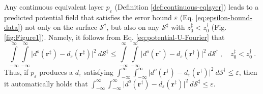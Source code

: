 \begin{remark}
	\label{rm:remark3}
	Any continuous equivalent layer $p_{\varepsilon}$ (Definition \ref{def:continuous-eqlayer}) leads to a predicted 
	potential field that satisfies
	the error bound $\varepsilon$ (Eq. \ref{eq:epsilon-bound-data}) not only on the surface $\mathcal{S}^{\dagger}$, but also 
	on any $\mathcal{S}^{\ddagger}$ with $z^{\ddagger}_{0} < z^{\dagger}_{0}$ (Fig. \ref{fig:Figure1}). 
	Namely, it follows from Eq. \ref{eq:potential-U-Fourier} that
	\begin{equation}
		\int\limits_{-\infty}^{\infty} \int\limits_{-\infty}^{\infty}
		\vert d^{o}(\mathbf{r}^{\ddagger}) - d_{\varepsilon}(\mathbf{r}^{\ddagger})
		\vert^{2} \: d\mathcal{S}^{\ddagger} \le
		\int\limits_{-\infty}^{\infty} \int\limits_{-\infty}^{\infty}
		\vert d^{o}(\mathbf{r}^{\dagger}) - d_{\varepsilon}(\mathbf{r}^{\dagger})
		\vert^{2} \: d\mathcal{S}^{\dagger} \: ,
		\quad z^{\ddagger}_{0} < z^{\dagger}_{0} \: .
		\label{eq:error-bound-upper-planes}
	\end{equation}
	Thus, if $p_{\varepsilon}$ produces a $d_{\varepsilon}$ satisfying 
	$\int_{-\infty}^{\infty} \int_{-\infty}^{\infty} \vert d^{o}(\mathbf{r}^{\dagger}) - d_{\varepsilon}(\mathbf{r}^{\dagger}) 
	\vert^{2} \: d\mathcal{S}^{\dagger} \le \varepsilon$, then it automatically holds that 
	$\int_{-\infty}^{\infty} \int_{-\infty}^{\infty} \vert d^{o}(\mathbf{r}^{\ddagger}) - d_{\varepsilon}(\mathbf{r}^{\ddagger}) 
	\vert^{2} \: d\mathcal{S}^{\ddagger} \le \varepsilon$.
\end{remark}

